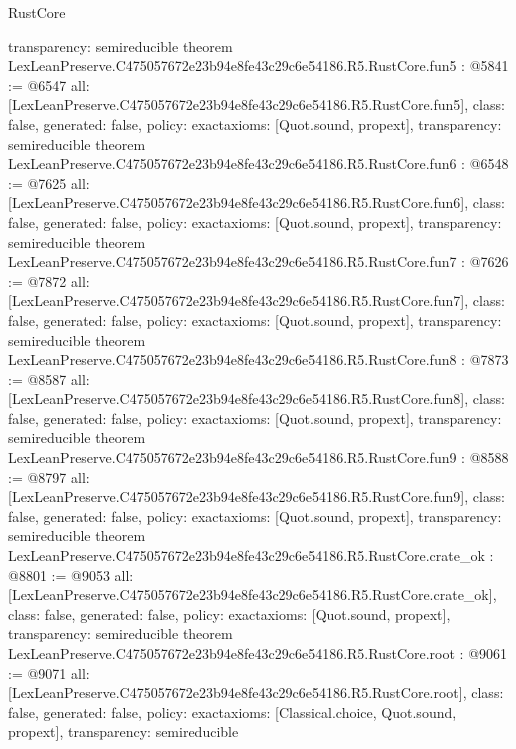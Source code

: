 \begin{lexlean}{RustCore}
\begin{coremodule}
{  transparency: semireducible
}
theorem LexLeanPreserve.C475057672e23b94e8fe43c29c6e54186.R5.RustCore.fun5 : @5841 := @6547 {
  all: [LexLeanPreserve.C475057672e23b94e8fe43c29c6e54186.R5.RustCore.fun5],
  class: false,
  generated: false,
  policy: exact{axioms: [Quot.sound, propext]},
  transparency: semireducible
}
theorem LexLeanPreserve.C475057672e23b94e8fe43c29c6e54186.R5.RustCore.fun6 : @6548 := @7625 {
  all: [LexLeanPreserve.C475057672e23b94e8fe43c29c6e54186.R5.RustCore.fun6],
  class: false,
  generated: false,
  policy: exact{axioms: [Quot.sound, propext]},
  transparency: semireducible
}
theorem LexLeanPreserve.C475057672e23b94e8fe43c29c6e54186.R5.RustCore.fun7 : @7626 := @7872 {
  all: [LexLeanPreserve.C475057672e23b94e8fe43c29c6e54186.R5.RustCore.fun7],
  class: false,
  generated: false,
  policy: exact{axioms: [Quot.sound, propext]},
  transparency: semireducible
}
theorem LexLeanPreserve.C475057672e23b94e8fe43c29c6e54186.R5.RustCore.fun8 : @7873 := @8587 {
  all: [LexLeanPreserve.C475057672e23b94e8fe43c29c6e54186.R5.RustCore.fun8],
  class: false,
  generated: false,
  policy: exact{axioms: [Quot.sound, propext]},
  transparency: semireducible
}
theorem LexLeanPreserve.C475057672e23b94e8fe43c29c6e54186.R5.RustCore.fun9 : @8588 := @8797 {
  all: [LexLeanPreserve.C475057672e23b94e8fe43c29c6e54186.R5.RustCore.fun9],
  class: false,
  generated: false,
  policy: exact{axioms: [Quot.sound, propext]},
  transparency: semireducible
}
theorem LexLeanPreserve.C475057672e23b94e8fe43c29c6e54186.R5.RustCore.crate_ok : @8801 := @9053 {
  all: [LexLeanPreserve.C475057672e23b94e8fe43c29c6e54186.R5.RustCore.crate_ok],
  class: false,
  generated: false,
  policy: exact{axioms: [Quot.sound, propext]},
  transparency: semireducible
}
theorem LexLeanPreserve.C475057672e23b94e8fe43c29c6e54186.R5.RustCore.root : @9061 := @9071 {
  all: [LexLeanPreserve.C475057672e23b94e8fe43c29c6e54186.R5.RustCore.root],
  class: false,
  generated: false,
  policy: exact{axioms: [Classical.choice, Quot.sound, propext]},
  transparency: semireducible
}


\end{coremodule}
\end{lexlean}
